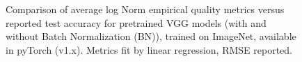 \begin{figure}[t]
    \centering
    \caption{Comparison of average log Norm empirical quality metrics versus reported test accuracy for pretrained VGG models (with and without Batch Normalization (BN)), trained on ImageNet, available in pyTorch (v1.x).  Metrics fit by linear regression, RMSE reported. }
    \label{fig:vgg-metrics}
\end{figure}


